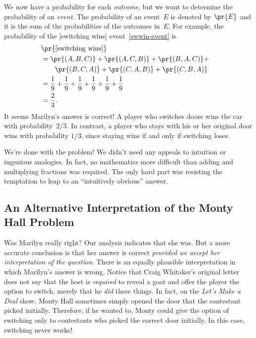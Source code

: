 We now have a probability for each \emph{outcome}, but we want to
determine the probability of an \emph{event}.  The probability of an
event~$E$ is denoted by $\pr{E}$ and it is the sum of the
probabilities of the outcomes in~$E$.  For example, the probability of
the [switching wins] event~\eqref{swwin-event} is
\begin{align*}
\lefteqn{\pr{[\text{switching wins}]}}\\
    & = \pr{(A, B, C)} + \pr{(A, C, B)} + \pr{(B, A, C)} + \\
    & \qquad \pr{(B, C, A)} + \pr{(C, A, B)} + \pr{(C, B, A)} \\
    & = \frac{1}{9} + \frac{1}{9} + \frac{1}{9} +
        \frac{1}{9} + \frac{1}{9} + \frac{1}{9} \\
    & = \frac{2}{3}.
\end{align*}
It seems Marilyn's answer is correct!  A player who switches doors
wins the car with probability~$2/3$.  In contrast, a player who stays
with his or her original door wins with probability $1/3$, since
staying wins if and only if switching loses.

We're done with the problem!  We didn't need any appeals to intuition
or ingenious analogies.  In fact, no mathematics more difficult than
adding and multiplying fractions was required.  The only hard part was
resisting the temptation to leap to an ``intuitively obvious'' answer.

\subsection{An Alternative Interpretation of the Monty Hall Problem}

Was Marilyn really right?  Our analysis indicates that she was.  But a
more accurate conclusion is that her answer is correct \emph{provided
  we accept her interpretation of the question}.  There is an equally
plausible interpretation in which Marilyn's answer is wrong.  Notice
that Craig Whitaker's original letter does not say that the host is
\emph{required} to reveal a goat and offer the player the option to
switch, merely that he \emph{did} these things.  In fact, on the
\emph{Let's Make a Deal} show, Monty Hall sometimes simply opened the
door that the contestant picked initially.  Therefore, if he wanted
to, Monty could give the option of switching only to contestants who
picked the correct door initially.  In this case, switching never
works!


